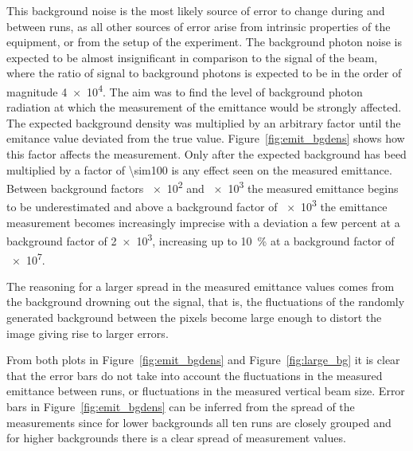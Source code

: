 This background noise is the most likely source of error to change during and
between runs, as all other sources of error arise from intrinsic properties of
the equipment, or from the setup of the experiment. The background photon noise
is expected to be almost insignificant in comparison to the signal of the beam,
where the ratio of signal to background photons is expected to be in the order
of magnitude \num{4e4}. The aim was to find the level of background photon
radiation at which the measurement of the emittance would be strongly affected.
The expected background density was multiplied by an arbitrary factor until the
emitance value deviated from the true value.  Figure~\ref{fig:emit_bgdens} shows
how this factor affects the measurement. Only after the expected background has
beed multiplied by a factor of \num{\sim100} is any effect seen on the measured
emittance. Between background factors \num{e2} and \num{e3} the measured
emittance begins to be underestimated and above a background factor of \num{e3}
the emittance measurement becomes increasingly imprecise with a deviation a few
percent at a background factor of \num{2e3}, increasing up to \SI{10}{\percent}
at a background factor of \num{e7}.

The reasoning for a larger spread in the measured emittance values comes from
the background drowning out the signal, that is, the fluctuations of the
randomly generated background between the pixels become large enough to distort
the image giving rise to larger errors.

From both plots in Figure~\ref{fig:emit_bgdens} and Figure~\ref{fig:large_bg} it
is clear that the error bars do not take into account the fluctuations in the
measured emittance between runs, or fluctuations in the measured vertical beam
size. Error bars in Figure~\ref{fig:emit_bgdens} can be inferred from the spread
of the measurements since for lower backgrounds all ten runs are closely grouped
and for higher backgrounds there is a clear spread of measurement values.



